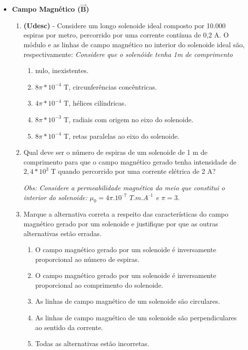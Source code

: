 \documentclass[12pt,letterpaper,fleqn]{article}
\begin{document}
    \begin{itemize}
        \item \textbf{Campo Magnético ($\mathbf{\vec{B}}$)}
        
        \begin{enumerate}
            \item \textbf{(Udesc)} - Considere um longo solenoide ideal composto por 10.000 espiras por metro, percorrido por uma corrente contínua de 0,2 A. O módulo e as linhas de campo magnético no interior do solenoide ideal são, respectivamente:
            \textit{Considere que o solenóide tenha 1m de comprimento}
            
            \begin{enumerate}
                \item nulo, inexistentes. 
                \item $8\pi*10^{-4}$ T, circunferências concêntricas.
                \item $4\pi*10^{-4}$ T, hélices cilíndricas.
                \item $8\pi*10^{-3}$ T, radiais com origem no eixo do solenoide.
                \item $8\pi*10^{-4}$ T, retas paralelas ao eixo do solenoide.
            \end{enumerate}
            
            \item Qual deve ser o número de espiras de um solenoide de 1 m de comprimento para que o campo magnético gerado tenha intensidade de $2,4*10^3$ T quando percorrido por uma corrente elétrica de 2 A?
            
            \textit{Obs: Considere a permeabilidade magnética do meio que constitui o interior do solenoide: $\mu_0 = 4\pi.10^{–7}$ $T.m.A^{–1}$ e $\pi = 3$.}
            
            \item Marque a alternativa correta a respeito das características do campo magnético gerado por um solenoide e justifique por que as outras alternativas estão erradas.
            
            \begin{enumerate}
                \item O campo magnético gerado por um solenoide é inversamente proporcional ao número de espiras.
                \item O campo magnético gerado por um solenoide é inversamente proporcional ao comprimento do solenoide.
                \item As linhas de campo magnético de um solenoide são circulares.
                \item As linhas de campo magnético de um solenoide são perpendiculares ao sentido da corrente.
                \item Todas as alternativas estão incorretas.
            \end{enumerate}
            

\end{enumerate}
\end{itemize}
\end{document}
